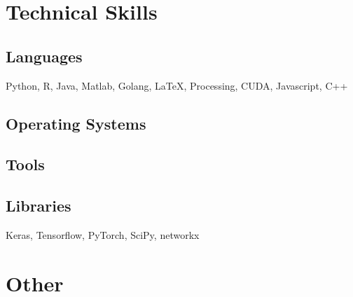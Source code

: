 \documentclass[11pt,a4paper,sans]{moderncv} %
\begin{document}
\section{Technical Skills}

\subsection{Languages}
\cvitem{} {Python, R, Java, Matlab, Golang, LaTeX, Processing, CUDA, Javascript, C++}

\subsection{Operating Systems}

\subsection{Tools}

\subsection{Libraries}
\cvitem{} {Keras, Tensorflow, PyTorch, SciPy, networkx}

\section{Other}
\end{document}
